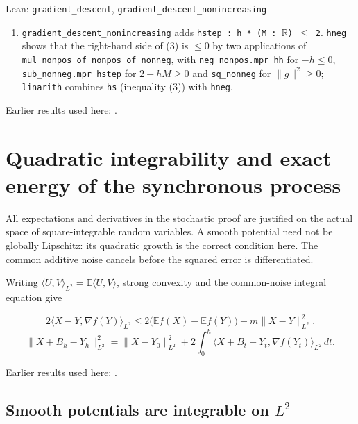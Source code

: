 \documentclass[11pt,a4paper]{report}
\begin{document}
\begin{leanbox}{Lean: \texttt{gradient\_\allowbreak{}descent}, \texttt{gradient\_\allowbreak{}descent\_\allowbreak{}nonincreasing}}
\begin{enumerate}
\item \texttt{gradient\_\allowbreak{}descent\_\allowbreak{}nonincreasing} adds \texttt{hstep : h * (M : \ensuremath{\mathbb R}) \ensuremath{\le} 2}. \texttt{hneg} shows that the right-hand side of (3) is \(\le0\) by two applications of \texttt{mul\_\allowbreak{}nonpos\_\allowbreak{}of\_\allowbreak{}nonpos\_\allowbreak{}of\_\allowbreak{}nonneg}, with \texttt{neg\_\allowbreak{}nonpos.\allowbreak{}mpr hh} for \(-h\le0\), \texttt{sub\_\allowbreak{}nonneg.\allowbreak{}mpr hstep} for \(2-hM\ge0\) and \texttt{sq\_\allowbreak{}nonneg} for \(\|g\|^2\ge0\); \texttt{linarith} combines \texttt{hs} (inequality (3)) with \texttt{hneg}.

\end{enumerate}
\end{leanbox}


Earlier results used here: \cite[Section~3.9.1]{LangevinLean2026ULASC}.
\section{\texorpdfstring{Quadratic integrability and exact energy of the synchronous process}{Quadratic integrability and exact energy of the synchronous process}}
\label{proof-module-AverageLMC-PathwiseEnergy-lean}


All expectations and derivatives in the stochastic proof are justified on the actual space of square-integrable random variables. A smooth potential need not be globally Lipschitz: its quadratic growth is the correct condition here. The common additive noise cancels before the squared error is differentiated.



Writing \(\langle U,V\rangle_{L^2}=\mathbb E\langle U,V\rangle\), strong convexity and the common-noise integral equation give


\[2\langle X-Y,\nabla f(Y)\rangle_{L^2}\le 2\bigl(\mathbb Ef(X)-\mathbb Ef(Y)\bigr)-m\|X-Y\|_{L^2}^{2}.\]
\[\|X+B_h-Y_h\|_{L^2}^{2}=\|X-Y_0\|_{L^2}^{2}+2\int_0^h\langle X+B_t-Y_t,\nabla f(Y_t)\rangle_{L^2}\,dt.\]

Earlier results used here: \cite[Section~3.15]{LangevinLean2026Proximal}.
\subsection{\texorpdfstring{Smooth potentials are integrable on \(L^{2}\)}{Smooth potentials are integrable on L²}}
\label{report-step-AverageLMC-PathwiseEnergy-lean-1}
\end{document}
